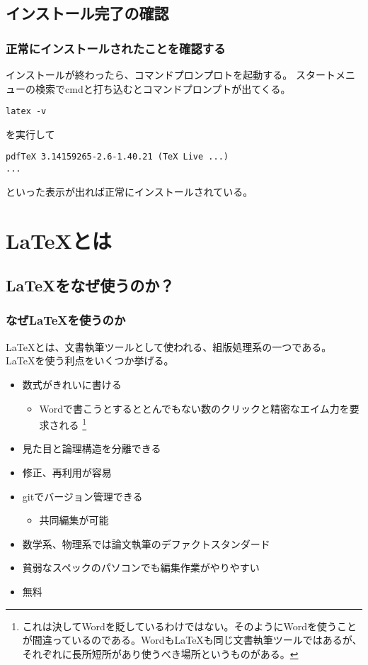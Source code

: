 \documentclass{beamer}
\begin{document}

\subsection{インストール完了の確認}
\begin{frame}[fragile]
  \frametitle{正常にインストールされたことを確認する}
  インストールが終わったら、コマンドプロンプロトを起動する。
  スタートメニューの検索でcmdと打ち込むとコマンドプロンプトが出てくる。
  \begin{verbatim}
latex -v
  \end{verbatim}
  を実行して
  \begin{verbatim}
pdfTeX 3.14159265-2.6-1.40.21 (TeX Live ...)
...
  \end{verbatim}
  といった表示が出れば正常にインストールされている。
\end{frame}

\section{\LaTeX とは}
\subsection{\LaTeX をなぜ使うのか？}
\begin{frame}
  \frametitle{なぜ\LaTeX を使うのか}
  \LaTeX とは、文書執筆ツールとして使われる、組版処理系の一つである。
\LaTeX を使う利点をいくつか挙げる。
\begin{itemize}
  \item 数式がきれいに書ける
  \begin{itemize}
    \item Wordで書こうとするととんでもない数のクリックと精密なエイム力を要求される
    \footnote{これは決してWordを貶しているわけではない。そのようにWordを使うことが間違っているのである。Wordも\LaTeX も同じ文書執筆ツールではあるが、それぞれに長所短所があり使うべき場所というものがある。}
  \end{itemize}
  \item 見た目と論理構造を分離できる
  \item 修正、再利用が容易
  \item gitでバージョン管理できる
  \begin{itemize}
    \item 共同編集が可能
  \end{itemize}
  \item 数学系、物理系では論文執筆のデファクトスタンダード
  \item 貧弱なスペックのパソコンでも編集作業がやりやすい
  \item 無料
\end{itemize}
  
\end{frame}
\end{document}
